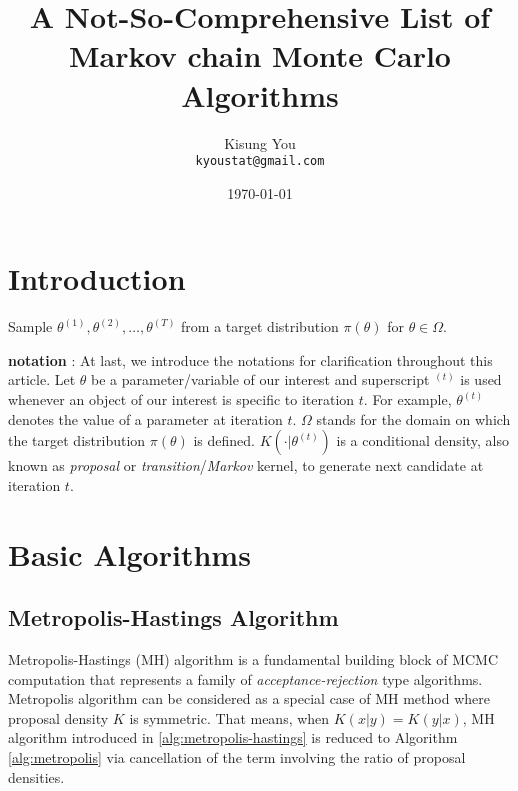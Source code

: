 \documentclass[fontsize=12pt]{article}
\title{A Not-So-Comprehensive List of \\
	Markov chain Monte Carlo Algorithms}
\author{
	Kisung You\\
	\texttt{kyoustat@gmail.com}
}
\date{\today}
\begin{document}
\maketitle
\tableofcontents

\section{Introduction}

Sample $\theta^{(1)},\theta^{(2)},\ldots,\theta^{(T)}$ from a target distribution $\pi(\theta)$ for $\theta \in \Omega$.

\textbf{notation} : At last, we introduce the notations for clarification throughout this article. Let $\theta$ be a parameter/variable of our interest and superscript $^{(t)}$ is used whenever an object of our interest is specific to iteration $t$. For example, $\theta^{(t)}$ denotes the value of a parameter at iteration $t$. $\Omega$ stands for the domain on which the target distribution $\pi(\theta)$ is defined. $K(\cdot | \theta^{(t)})$ is a conditional density, also known as \textit{proposal} or  \textit{transition}/\textit{Markov} kernel, to generate next candidate at iteration $t$.


\section{Basic Algorithms}\label{sec:basic}

\subsection{Metropolis-Hastings Algorithm}

Metropolis-Hastings (MH) algorithm \cite{metropolis_equation_1953, hastings_monte_1970} is a fundamental building block of MCMC computation that represents a family of \textit{acceptance-rejection} type algorithms. Metropolis algorithm can be considered as a special case of MH method where proposal density $K$ is symmetric. That means, when $K(x\vert y) = K(y\vert x)$, MH algorithm introduced in \ref{alg:metropolis-hastings} is reduced to Algorithm \ref{alg:metropolis} via cancellation of the term involving the ratio of proposal densities. 
\end{document}
